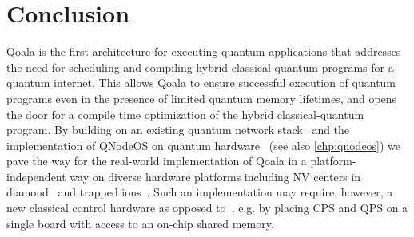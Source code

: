 \section{Conclusion}
\label{qoala:sec:conclusion}
Qoala is the first architecture for executing quantum applications that addresses the need for scheduling and compiling hybrid classical-quantum programs for a quantum internet.
This allows Qoala to ensure successful execution of quantum programs even in the presence of limited quantum memory lifetimes, and opens the door for a compile time optimization of the hybrid classical-quantum program.
By building on an existing quantum network stack~\cite{dahlberg2019link, pompili2022experimental} and the implementation of QNodeOS on quantum hardware~\cite{pompili2022experimental, qnodeos_nature} (see also \cref{chp:qnodeos}) we pave the way for the real-world implementation of Qoala in a platform-independent way on diverse hardware platforms including NV centers in diamond~\cite{pompili2021realization, pompili2022experimental} and trapped ions~\cite{krutyanskiy2023entanglement,krutyanskiy2023telecom}.
Such an implementation may require, however, a new classical control hardware as opposed to~\cite{pompili2022experimental, qnodeos_nature}, e.g. by placing CPS and QPS on a single board with access to an on-chip shared memory. 

